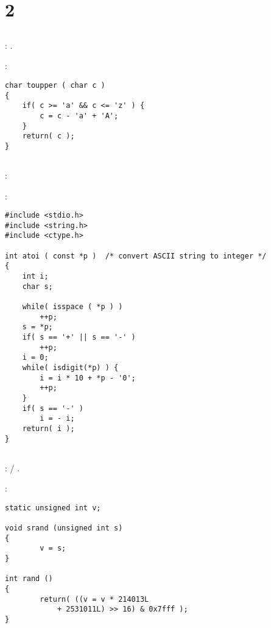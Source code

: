 \chapter{ 2}

\section{}

: .

:

\begin{lstlisting}
char toupper ( char c )
{
    if( c >= 'a' && c <= 'z' ) {
        c = c - 'a' + 'A';
    }
    return( c );
}
\end{lstlisting}

\section{}

: 

:

\begin{lstlisting}
#include <stdio.h>
#include <string.h>
#include <ctype.h>

int atoi ( const *p )  /* convert ASCII string to integer */
{
    int i;
    char s;

    while( isspace ( *p ) )
        ++p;
    s = *p;
    if( s == '+' || s == '-' )
        ++p;
    i = 0;
    while( isdigit(*p) ) {
        i = i * 10 + *p - '0';
        ++p;
    }
    if( s == '-' )
        i = - i;
    return( i );
}
\end{lstlisting}

\section{}

:  / .

:

\begin{lstlisting}
static unsigned int v;

void srand (unsigned int s)
{
        v = s;
}

int rand ()
{
        return( ((v = v * 214013L
            + 2531011L) >> 16) & 0x7fff );
}
\end{lstlisting}

